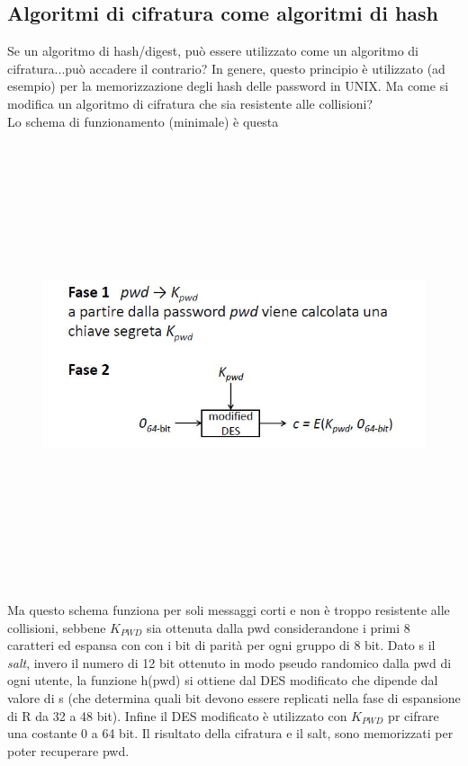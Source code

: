 \subsection{Algoritmi di cifratura come algoritmi di hash}
Se un algoritmo di hash/digest, può essere utilizzato come un algoritmo di cifratura...può accadere il contrario?
In genere, questo principio è utilizzato (ad esempio) per la memorizzazione degli hash delle password in UNIX.
Ma come si modifica un algoritmo di cifratura che sia resistente alle collisioni?\\
Lo schema di funzionamento (minimale) è questa
\begin{figure}
	\begin{center}
	{\includegraphics[height=13cm, width=13cm, keepaspectratio]{Immagini/hash/schema_des_come_hash.JPG}}
	\end{center}
\end{figure}
Ma questo schema funziona per soli messaggi corti e non è troppo resistente alle collisioni, sebbene $K_{PWD}$ sia ottenuta dalla pwd considerandone i primi 8 caratteri ed espansa con con i bit di parità per ogni gruppo di 8 bit.
Dato s il \textit{salt}, invero il numero di 12 bit ottenuto in modo pseudo randomico dalla pwd di ogni utente, la funzione h(pwd) si ottiene dal DES modificato che dipende dal valore di s (che determina quali bit  devono essere replicati nella fase di espansione di R da 32 a 48 bit). Infine il DES modificato è utilizzato con $K_{PWD}$ pr cifrare una costante 0 a 64 bit. Il risultato della cifratura e il salt, sono memorizzati per poter recuperare pwd.

